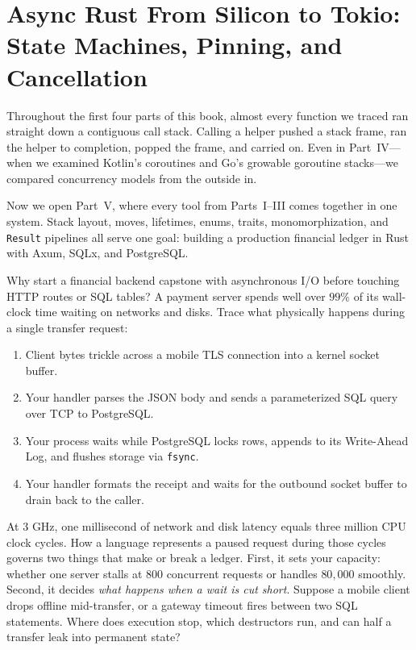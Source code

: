 \chapter{Async Rust From Silicon to Tokio: State Machines, Pinning, and Cancellation}

Throughout the first four parts of this book, almost every function we traced ran straight down a contiguous call stack. Calling a helper pushed a stack frame, ran the helper to completion, popped the frame, and carried on. Even in Part~IV---when we examined Kotlin's coroutines and Go's growable goroutine stacks---we compared concurrency models from the outside in.

Now we open Part~V, where every tool from Parts~I--III comes together in one system. Stack layout, moves, lifetimes, enums, traits, monomorphization, and \texttt{Result} pipelines all serve one goal: building a production financial ledger in Rust with Axum, SQLx, and PostgreSQL.

Why start a financial backend capstone with asynchronous I/O before touching HTTP routes or SQL tables? A payment server spends well over $99\%$ of its wall-clock time waiting on networks and disks. Trace what physically happens during a single transfer request:
\begin{enumerate}
  \item Client bytes trickle across a mobile TLS connection into a kernel socket buffer.
  \item Your handler parses the JSON body and sends a parameterized SQL query over TCP to PostgreSQL.
  \item Your process waits while PostgreSQL locks rows, appends to its Write-Ahead Log, and flushes storage via \texttt{fsync}.
  \item Your handler formats the receipt and waits for the outbound socket buffer to drain back to the caller.
\end{enumerate}

At $3\text{ GHz}$, one millisecond of network and disk latency equals three million CPU clock cycles. How a language represents a paused request during those cycles governs two things that make or break a ledger. First, it sets your capacity: whether one server stalls at $800$ concurrent requests or handles $80{,}000$ smoothly. Second, it decides \emph{what happens when a wait is cut short}. Suppose a mobile client drops offline mid-transfer, or a gateway timeout fires between two SQL statements. Where does execution stop, which destructors run, and can half a transfer leak into permanent state?

